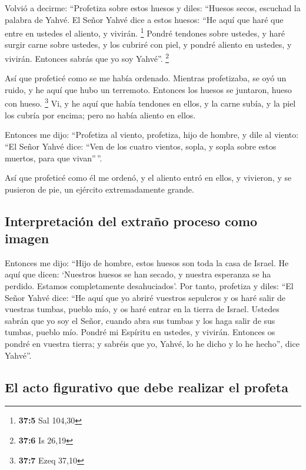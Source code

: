  Volvió a decirme: ``Profetiza sobre estos huesos y diles:
``Huesos secos, escuchad la palabra de Yahvé.  El Señor
Yahvé dice a estos huesos: ``He aquí que haré que entre en ustedes el
aliento, y vivirán. \footnote{\textbf{37:5} Sal 104,30} 
Pondré tendones sobre ustedes, y haré surgir carne sobre ustedes, y los
cubriré con piel, y pondré aliento en ustedes, y vivirán. Entonces
sabrás que yo soy Yahvé''. \footnote{\textbf{37:6} Is 26,19}

 Así que profeticé como se me había ordenado. Mientras
profetizaba, se oyó un ruido, y he aquí que hubo un terremoto. Entonces
los huesos se juntaron, hueso con hueso. \footnote{\textbf{37:7} Ezeq
  37,10}  Vi, y he aquí que había tendones en ellos, y la
carne subía, y la piel los cubría por encima; pero no había aliento en
ellos.

 Entonces me dijo: ``Profetiza al viento, profetiza, hijo
de hombre, y dile al viento: ``El Señor Yahvé dice: ``Ven de los cuatro
vientos, sopla, y sopla sobre estos muertos, para que vivan''\,''.

 Así que profeticé como él me ordenó, y el aliento entró
en ellos, y vivieron, y se pusieron de pie, un ejército extremadamente
grande.

\hypertarget{interpretaciuxf3n-del-extrauxf1o-proceso-como-imagen}{%
\subsection{Interpretación del extraño proceso como
imagen}\label{interpretaciuxf3n-del-extrauxf1o-proceso-como-imagen}}

 Entonces me dijo: ``Hijo de hombre, estos huesos son
toda la casa de Israel. He aquí que dicen: `Nuestros huesos se han
secado, y nuestra esperanza se ha perdido. Estamos completamente
desahuciados'.  Por tanto, profetiza y diles: ``El Señor
Yahvé dice: ``He aquí que yo abriré vuestros sepulcros y os haré salir
de vuestras tumbas, pueblo mío, y os haré entrar en la tierra de Israel.
 Ustedes sabrán que yo soy el Señor, cuando abra sus
tumbas y los haga salir de sus tumbas, pueblo mío. 
Pondré mi Espíritu en ustedes, y vivirán. Entonces os pondré en vuestra
tierra; y sabréis que yo, Yahvé, lo he dicho y lo he hecho'', dice
Yahvé''.

\hypertarget{el-acto-figurativo-que-debe-realizar-el-profeta}{%
\subsection{El acto figurativo que debe realizar el
profeta}\label{el-acto-figurativo-que-debe-realizar-el-profeta}}

